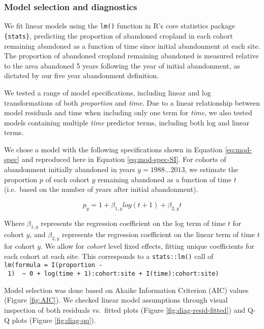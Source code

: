 \documentclass[9pt,twocolumn,twoside,lineno]{pnas-new}
\begin{document}
\hypertarget{model-selection-and-diagnostics}{%
\subsubsection{Model selection and diagnostics}\label{model-selection-and-diagnostics}}

We fit linear models using the \texttt{lm()} function in R's core statistics package \texttt{\{stats\}}, predicting the proportion of abandoned cropland in each cohort remaining abandoned as a function of time since initial abandonment at each site.
The proportion of abandoned cropland remaining abandoned is measured relative to the area abandoned 5 years following the year of initial abandonment, as dictated by our five year abandonment definition.

We tested a range of model specifications, including linear and log transformations of both \emph{proportion} and \emph{time}.
Due to a linear relationship between model residuals and time when including only one term for \emph{time}, we also tested models containing multiple \emph{time} predictor terms, including both log and linear terms.

We chose a model with the following specifications shown in Equation \eqref{eq:mod-spec} and reproduced here in Equation \eqref{eq:mod-spec-SI}.
For cohorts of abandonment initially abandoned in years \(y = 1988 ... 2013\), we estimate the proportion \(p\) of each cohort \(y\) remaining abandoned as a function of time \(t\) (i.e.~based on the number of years after initial abandonment).

\begin{equation}
p_{y} = 1 + \beta_{1,y} log(t + 1) + \beta_{2,y} t \label{eq:mod-spec-SI}
\end{equation}

Where \(\beta_{1,y}\) represents the regression coefficient on the log term of time \(t\) for cohort \(y\), and \(\beta_{2,y}\) represents the regression coefficient on the linear term of time \(t\) for cohort \(y\).
We allow for \emph{cohort} level fixed effects, fitting unique coefficients for each cohort at each site.
This corresponds to a \texttt{stats::lm()} call of \texttt{lm(formula\ =\ I(proportion\ -\ 1)\ \ \textasciitilde{}\ 0\ +\ log(time\ +\ 1):cohort:site\ +\ I(time):cohort:site)}

Model selection was done based on Akaike Information Criterion (AIC) values (Figure \ref{fig:AIC}).
We checked linear model assumptions through visual inspection of both residuals vs.~fitted plots (Figure \ref{fig:diag-resid-fitted}) and Q-Q plots (Figure \ref{fig:diag-qq}).
\end{document}
